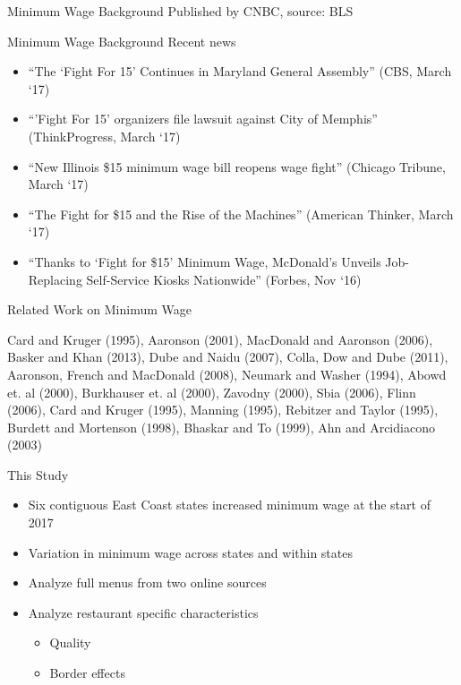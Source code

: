 \documentclass[xcolor=table]{beamer}
\begin{document}
\begin{spacing}{1.2}
\begin{frame}{Minimum Wage Background}
\raggedleft
\tiny{Published by CNBC, source: BLS}
\end{frame}

\begin{frame}{Minimum Wage Background}
Recent news
\begin{itemize}
\item ``The `Fight For 15' Continues in Maryland General Assembly'' (CBS, March `17)
\item ``'Fight For 15' organizers file lawsuit against City of Memphis'' (ThinkProgress, March `17)
\item ``New Illinois \$15 minimum wage bill reopens wage fight'' (Chicago Tribune, March `17)
\item ``The Fight for \$15 and the Rise of the Machines'' (American Thinker, March `17)
\item ``Thanks to `Fight for \$15' Minimum Wage, McDonald's Unveils Job-Replacing Self-Service Kiosks Nationwide'' (Forbes, Nov `16)
\end{itemize}
\end{frame}


\begin{frame}{Related Work on Minimum Wage}

Card and Kruger (1995), Aaronson (2001), MacDonald and Aaronson (2006), Basker and Khan (2013), Dube and Naidu (2007), Colla, Dow and  Dube (2011), Aaronson, French and MacDonald (2008), Neumark and Washer (1994), Abowd et. al (2000), Burkhauser et. al (2000), Zavodny (2000), Sbia (2006), Flinn (2006), Card and Kruger (1995), Manning (1995), Rebitzer and Taylor (1995), Burdett and Mortenson (1998), Bhaskar and To (1999), Ahn and Arcidiacono (2003)
 
\end{frame}

\begin{frame}{This Study}
\begin{itemize}
\item Six contiguous East Coast states increased minimum wage at the start of 2017
\item Variation in minimum wage across states and within states
\item Analyze full menus from two online sources
\item Analyze restaurant specific characteristics 
\begin{itemize}
\item Quality
\item Border effects
\end{itemize}


\end{itemize}
\end{frame}
\end{spacing}
\end{document}
